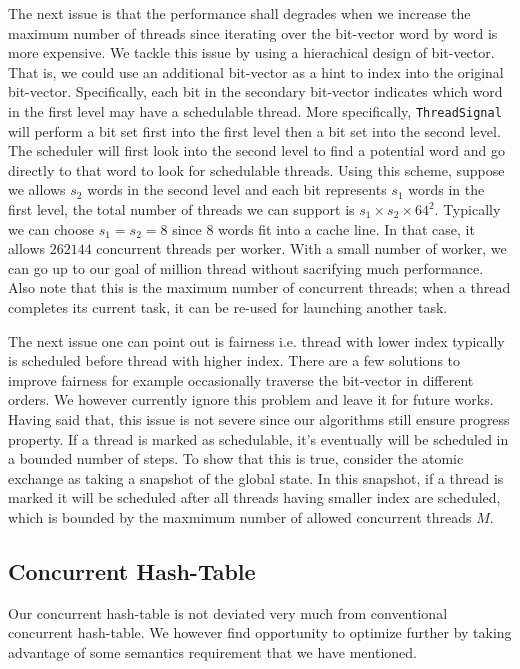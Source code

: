 The next issue is that the performance shall degrades when we increase the
maximum number of threads since iterating over the bit-vector word by word is
more expensive. We tackle this issue by using a hierachical design of
bit-vector.  That is, we could use an additional bit-vector as a hint to index
into the original bit-vector. Specifically, each bit in the secondary
bit-vector indicates which word in the first level may have a schedulable
thread. More specifically, \texttt{ThreadSignal} will perform a bit set first
into the first level then a bit set into the second level. The scheduler will
first look into the second level to find a potential word and go directly to
that word to look for schedulable threads. %
Using this scheme, suppose we allows $s_2$ words in the second level and each
bit represents $s_1$ words in the first level, the total number of threads we
can support is $s_1 \times s_2 \times 64^2$. Typically we can choose $s_1 = s_2
= 8$ since 8 words fit into a cache line. In that case, it allows $262144$
concurrent threads per worker. With a small number of worker, we can go up to
our goal of million thread without sacrifying much performance. Also note that
this is the maximum number of concurrent threads; when a thread completes its
current task, it can be re-used for launching another task.

The next issue one can point out is fairness i.e. thread with lower
index typically is scheduled before thread with higher index. There are a few
solutions to improve fairness for example occasionally traverse the bit-vector
in different orders. We however currently ignore this problem and leave it for
future works. Having said that, this issue is not severe since our algorithms
still ensure progress property. If a thread is marked as schedulable, it's
eventually will be scheduled in a bounded number of steps. To show that this is
true, consider the atomic exchange as taking a snapshot of the global state. In
this snapshot, if a thread is marked it will be scheduled after all threads
having smaller index are scheduled, which is bounded by the maxmimum number of
allowed concurrent threads $M$.

\subsection{Concurrent Hash-Table}
Our concurrent hash-table is not deviated very much from conventional
concurrent hash-table. We however find opportunity to optimize further by taking 
advantage of some semantics requirement that we have mentioned.


